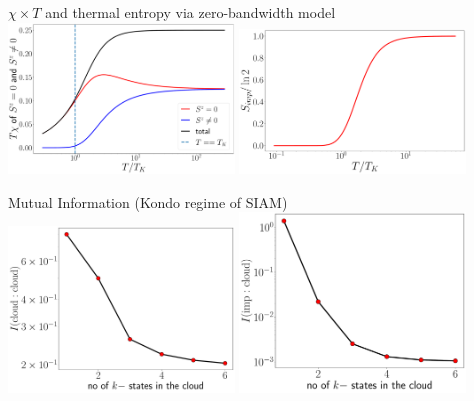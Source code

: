 \documentclass[aspectratio=169]{beamer}
\begin{document}
\begin{frame}[noframenumbering]{\(\chi \times T\) and thermal entropy via zero-bandwidth model}
	\includegraphics[width=0.45\textwidth]{figures/chi_times_T_parts.pdf}
	\includegraphics[width=0.45\textwidth]{figures/entropy_therm.pdf}
\end{frame}
\begin{frame}[noframenumbering]{Mutual Information (Kondo regime of SIAM)}
	\includegraphics[width=0.45\textwidth]{figures/mut_I_ee.pdf}
	\includegraphics[width=0.45\textwidth]{figures/mut_I_ie.pdf}
\end{frame}
\end{document}
